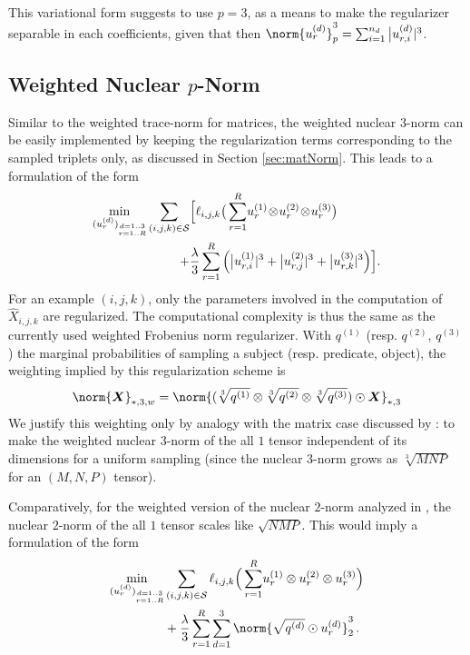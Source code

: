 \documentclass{article}
\newcommand{\tensor}[1]{{\bm #1}}
\newcommand{\tens}[1]{\tensor{#1}}
\newcommand{\rkv}{r}
\newcommand{\rk}{R}
\newcommand{\dv}{d}
\newcommand{\unkn}{X}
\newcommand{\pred}{\hat{\unkn}}
\newcommand{\indices}{{\cal S}}
\newcommand{\loss}{\ell}
\newcommand{\facv}[2]{u^{(#1)}_{#2}}
\newcommand{\nv}[1]{{n_{#1}}}
\begin{document}
This variational form suggests to use $p=3$, as a means to make the regularizer separable in each coefficients, given that then $\norm{\facv{\dv}{\rkv}}_p^3= \sum_{i=1}^{\nv{\dv}} \big|\facv{\dv}{\rkv, i}|^3$. 

\subsection{Weighted Nuclear $p$-Norm}

Similar to the weighted trace-norm for matrices, the weighted nuclear $3$-norm can be easily implemented by keeping the regularization terms corresponding to the sampled triplets only, as discussed in Section \ref{sec:matNorm}. This leads to a formulation of the form 
\begin{align}
\min_{(\facv{\dv}{\rkv})_{
\substack{\scriptscriptstyle \dv=1..3\\\scriptscriptstyle\rkv=1..\rk}}} \sum_{(i,j,k)\in\indices}& \Big [ \loss_{i,j,k}\big(\sum\limits_{\rkv=1}^\rk \!\facv{1}{\rkv} \!\otimes\! \facv{2}{\rkv}\!\otimes\!\facv{3}{\rkv}\big) \label{eq:weighted_nuclear_three} \\
+ &\frac{\lambda}{3}\sum_{r=1}^R\Big (\big|\facv{1}{\rkv, i}|^3 +  \big|\facv{2}{\rkv, j}|^3 +\big|\facv{3}{\rkv, k}|^3 \Big) \Big ]. \nonumber
\end{align}
For an example $(i, j, k)$, only the parameters involved in the computation of $\pred_{i,j,k}$ are regularized. The computational complexity is thus the same as the currently used weighted Frobenius norm regularizer. With $q^{(1)}$ (resp. $q^{(2)}$, $q^{(3)}$) the marginal probabilities of sampling a subject (resp. predicate, object), the weighting implied by this regularization scheme is 
$$\norm{\tens{X}}_{*,3,w} = \norm{(\sqrt[3]{q^{(1)}}\otimes\sqrt[3]{q^{(2)}}\otimes\sqrt[3]{q^{(3)}})\odot\tens{X}}_{*,3}$$
We justify this weighting only by analogy with the matrix case discussed by \citep{srebro_collaborative_2010}: to make the weighted nuclear $3$-norm of the all $1$ tensor independent of its dimensions for a uniform sampling (since the nuclear $3$-norm grows as $\sqrt[3]{MNP}$ for an $(M, N, P)$ tensor).

Comparatively, for the weighted version of the nuclear $2$-norm analyzed in \citet{yuan_tensor_2016}, the nuclear $2$-norm of the all $1$ tensor scales like $\sqrt{NMP}$. This would imply a formulation of the form
\begin{align}
\min_{(\facv{\dv}{\rkv})_{
\substack{\scriptscriptstyle \dv=1..3\\\scriptscriptstyle\rkv=1..\rk}}}
&\sum_{(i,j,k)\in\indices}
\loss_{i,j,k}\Big(\sum\limits_{\rkv=1}^\rk \!\facv{1}{\rkv} \otimes \facv{2}{\rkv}\otimes\facv{3}{\rkv}\Big) \nonumber \\
&+ \frac{\lambda}{3}\sum_{\rkv=1}^\rk \sum_{\dv=1}^3 \norm{\sqrt{q^{(d)}} \odot \facv{\dv}{\rkv}}_2^3\,.\label{eq:weighted_nuclear_two}
\end{align}
\end{document}
